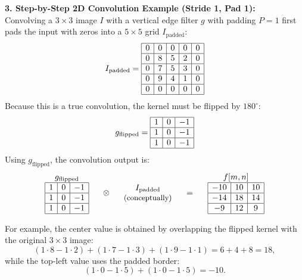 \begin{examplebox}
\textbf{3. Step-by-Step 2D Convolution Example (Stride 1, Pad 1):}\\
Convolving a $3 \times 3$ image $I$ with a vertical edge filter $g$ with padding $P = 1$ first pads the input with zeros into a $5 \times 5$ grid $I_{\text{padded}}$:
\[
I_{\text{padded}} = 
\begin{array}{|c|c|c|c|c|}
\hline
0 & 0 & 0 & 0 & 0 \\ \hline
0 & 8 & 5 & 2 & 0 \\ \hline
0 & 7 & 5 & 3 & 0 \\ \hline
0 & 9 & 4 & 1 & 0 \\ \hline
0 & 0 & 0 & 0 & 0 \\ \hline
\end{array}
\]
Because this is a true convolution, the kernel must be flipped by $180^\circ$:
\[
g_{\text{flipped}} = \begin{array}{|c|c|c|}
\hline
1 & 0 & -1 \\ \hline
1 & 0 & -1 \\ \hline
1 & 0 & -1 \\ \hline
\end{array}
\]
Using $g_{\text{flipped}}$, the convolution output is:
\[
\begin{array}{c} g_{\text{flipped}} \\ \begin{array}{|c|c|c|}
\hline
1 & 0 & -1 \\ \hline
1 & 0 & -1 \\ \hline
1 & 0 & -1 \\ \hline
\end{array} \end{array}
\quad \otimes \quad
\begin{array}{c} I_{\text{padded}} \\ \text{\small(conceptually)} \end{array}
\quad = \quad
\begin{array}{c} f[m,n] \\ \begin{array}{|c|c|c|}
\hline
-10 & 10 & 10 \\ \hline
-14 & 18 & 14 \\ \hline
-9 & 12 & 9 \\ \hline
\end{array} \end{array}
\]

For example, the center value is obtained by overlapping the flipped kernel with the original $3 \times 3$ image:
\[ (1 \cdot 8 - 1 \cdot 2) + (1 \cdot 7 - 1 \cdot 3) + (1 \cdot 9 - 1 \cdot 1) = 6 + 4 + 8 = 18, \]
while the top-left value uses the padded border:
\[ (1 \cdot 0 - 1 \cdot 5) + (1 \cdot 0 - 1 \cdot 5) = -10. \]
\end{examplebox}




